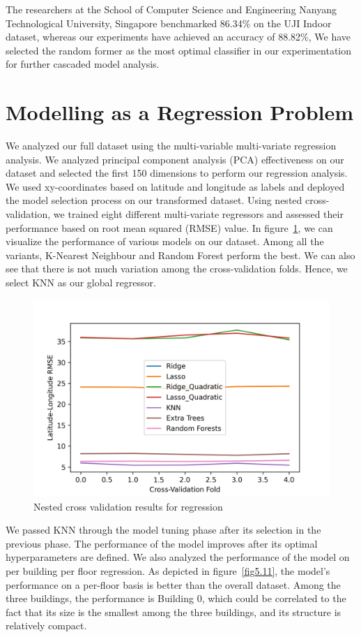 \documentclass[a4paper,singleside,12pt]{report} %
\begin{document}
			The researchers at the School of Computer Science and Engineering Nanyang Technological University, Singapore benchmarked 86.34\% on the UJI Indoor dataset, whereas our experiments have achieved an accuracy of 88.82\%,
			We have selected the random former as the most optimal classifier in our experimentation for further cascaded model analysis.

\newpage
\FloatBarrier
		\section{Modelling as a Regression Problem}

			We analyzed our full dataset using the multi-variable multi-variate regression analysis. 
			We analyzed principal component analysis (PCA) effectiveness on our dataset and selected the first 150 dimensions to perform our regression analysis. 
			We used xy-coordinates based on latitude and longitude as labels and deployed the model selection process on our transformed dataset. 
			Using nested cross-validation, we trained eight different multi-variate regressors and assessed their performance based on root mean squared (RMSE) value. 
			In figure~\ref{fig5.10}, we can visualize the performance of various models on our dataset. Among all the variants, K-Nearest Neighbour and Random Forest perform the best. 
			We can also see that there is not much variation among the cross-validation folds. Hence, we select KNN as our global regressor.
			
			\begin{figure}[!htb]
				\centering
				\includegraphics[width=0.8\linewidth]{./figures/nested_crossval_results.png}
				\caption{Nested cross validation results for regression}
				 \label{fig5.10}
			\end{figure}
			
			We passed KNN through the model tuning phase after its selection in the previous phase. 
			The performance of the model improves after its optimal hyperparameters are defined. 
			We also analyzed the performance of the model on per building per floor regression. 
			As depicted in figure~\ref{fig5.11}, the model's performance on a per-floor basis is better than the overall dataset. 
			Among the three buildings, the performance is Building 0, which could be correlated to the fact that its size is the smallest among the three buildings, and its structure is relatively compact. 
			
\end{document}
